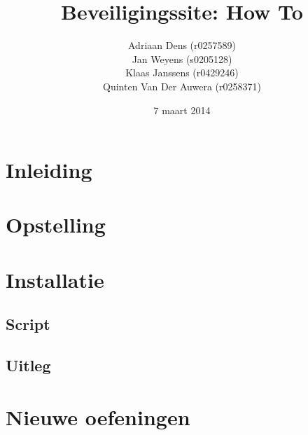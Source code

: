 \documentclass[a4paper,11pt]{report}
\begin{document}
\title{Beveiligingssite: How To}
\date{7 maart 2014}
\author{Adriaan Dens (r0257589)\\
	Jan Weyens (s0205128)\\
	Klaas Janssens (r0429246)\\
	Quinten Van Der Auwera (r0258371)
}	

\maketitle

\tableofcontents

\chapter{Inleiding}

\newpage

\chapter{Opstelling}

\newpage

\chapter{Installatie}

\section{Script}

\section{Uitleg}

\newpage

\chapter{Nieuwe oefeningen}

\end{document}
